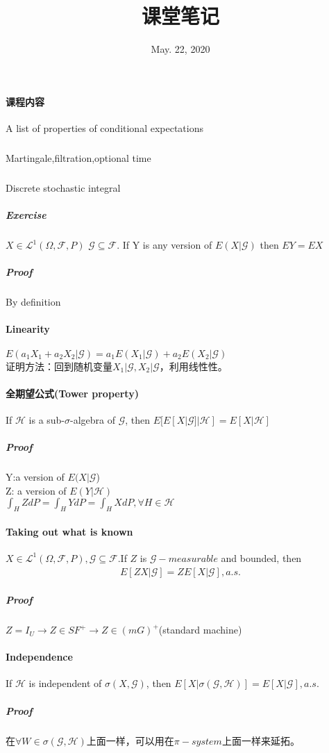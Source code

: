 \documentclass[UTF8]{ctexart}
\theoremstyle{definition}
\begin{document}
\title{课堂笔记}
\date{May. 22, 2020}

\maketitle
\paragraph{课程内容}A list of properties of conditional expectations
\subparagraph{}Martingale,filtration,optional time
\subparagraph{}Discrete stochastic integral\\

\subparagraph{Exercise}$X\in \mathcal{L}^1(\Omega,\mathcal{F},P)$ $\mathcal{G} \subseteq \mathcal{F}$. If Y is any version of $E(X|\mathcal{G})$ then $EY=EX$\\
\subparagraph{Proof} By definition\\
\paragraph{Linearity} $E(a_1X_1 + a_2X_2 | \mathcal{G}) = a_1E(X_1|\mathcal{G}) + a_2E(X_2|\mathcal{G})$\\
证明方法：回到随机变量$X_1|\mathcal{G},X_2|\mathcal{G}$，利用线性性。\\
\paragraph{全期望公式(Tower property)} If $\mathcal{H}$ is a sub-$\sigma$-algebra of $\mathcal{G}$, then $E[E[X|\mathcal{G}]|\mathcal{H}] = E[X|\mathcal{H}]$\\
\subparagraph{Proof} Y:a version of $E(X|\mathcal{G}$)\\
Z: a version of $E(Y|\mathcal{H})$\\
$\int_H ZdP = \int_H YdP = \int_H XdP ,\forall H\in \mathcal{H}$
\paragraph{Taking out what is known} $X\in \mathcal{L}^1(\Omega,\mathcal{F},P),\mathcal{G}\subseteq\mathcal{F}$.If $Z$ is $\mathcal{G}-measurable$ and bounded, then 
\begin{align*}
	E[ZX|\mathcal{G}] = ZE[X|\mathcal{G}],a.s.
\end{align*}
\subparagraph{Proof}$Z=I_U \rightarrow Z\in SF^+ \rightarrow Z\in(mG)^+$(standard machine)
\paragraph{Independence} If $\mathcal{H}$ is independent of $\sigma(X,\mathcal{G})$, then $E[X|\sigma(\mathcal{G},\mathcal{H})] = E[X|\mathcal{G}],a.s.$
\subparagraph{Proof} 在$\forall W\in \sigma(\mathcal{G},\mathcal{H})$上面一样，可以用在$\pi-system$上面一样来延拓。\\
\end{document}
